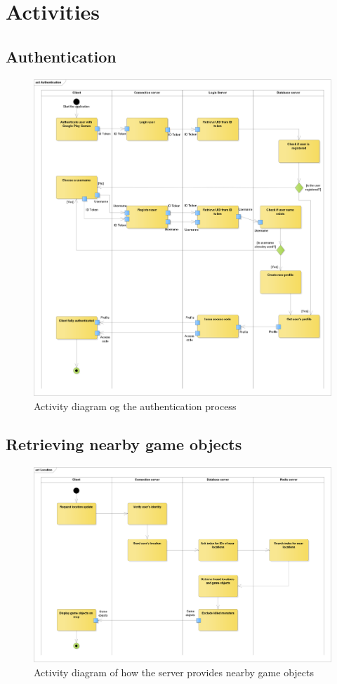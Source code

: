 \section{Activities}
	\subsection{Authentication}
	\begin{figure}[h]	
		\includegraphics[width=\textwidth]{figures/AD_Authentication}
		\centering			
		\caption{Activity diagram og the authentication process}
		\label{fig:adauth}
	\end{figure}

	\subsection{Retrieving nearby game objects}
	\begin{figure}[h]	
		\includegraphics[width=\textwidth]{figures/AD_Location}
		\centering			
		\caption{Activity diagram of how the server provides nearby game objects}
		\label{fig:adlocation}
	\end{figure}



